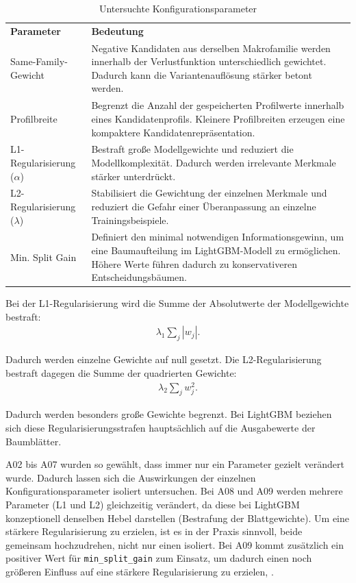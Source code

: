 \begin{table}[H] 
    \centering 
    \caption{Untersuchte Konfigurationsparameter} 
    \label{tab:konfigurationsparameter} 
    \begin{tabularx}{\textwidth}{p{4cm}X} 
        \toprule \textbf{Parameter} & \textbf{Bedeutung} \\ 
        Same-Family-Gewicht &  Negative Kandidaten aus derselben Makrofamilie werden innerhalb der Verlustfunktion unterschiedlich gewichtet. Dadurch kann die Variantenauflösung stärker betont werden. \\ 
        Profilbreite & Begrenzt die Anzahl der gespeicherten Profilwerte innerhalb eines Kandidatenprofils. Kleinere Profilbreiten erzeugen eine kompaktere Kandidatenrepräsentation. \\ 
        L1-Regularisierung ($\alpha$) & Bestraft große Modellgewichte und reduziert die Modellkomplexität. Dadurch werden irrelevante Merkmale stärker unterdrückt. \\ 
        L2-Regularisierung ($\lambda$) & Stabilisiert die Gewichtung der einzelnen Merkmale und reduziert die Gefahr einer Überanpassung an einzelne Trainingsbeispiele. \\ 
        Min. Split Gain & Definiert den minimal notwendigen Informationsgewinn, um eine Baumaufteilung im LightGBM-Modell zu ermöglichen. Höhere Werte führen dadurch zu konservativeren Entscheidungsbäumen. \\ 
        \bottomrule 
    \end{tabularx} 
\end{table} 

Bei der L1-Regularisierung wird die Summe der Absolutwerte der Modellgewichte bestraft:
\begin{align}
  \lambda_1 \sum_j |w_j|.
\end{align}

Dadurch werden einzelne Gewichte auf null gesetzt. 
Die L2-Regularisierung bestraft dagegen die Summe der quadrierten Gewichte:
\begin{align}
  \lambda_2 \sum_j w_j^2.
\end{align}

Dadurch werden besonders große Gewichte begrenzt. Bei LightGBM beziehen sich diese Regularisierungsstrafen hauptsächlich auf die Ausgabewerte der Baumblätter.

A02 bis A07 wurden so gewählt, dass immer nur ein Parameter gezielt verändert wurde. Dadurch lassen sich die Auswirkungen der einzelnen Konfigurationsparameter isoliert untersuchen.
Bei A08 und A09 werden mehrere Parameter (L1 und L2) gleichzeitig verändert, da diese bei LightGBM konzeptionell denselben Hebel darstellen (Bestrafung der Blattgewichte). 
Um eine stärkere Regularisierung zu erzielen, ist es in der Praxis sinnvoll, beide gemeinsam hochzudrehen, nicht nur einen isoliert.
Bei A09 kommt zusätzlich ein positiver Wert für \texttt{min\_split\_gain} zum Einsatz, um dadurch einen noch größeren Einfluss auf eine stärkere Regularisierung zu erzielen, \parencite{LTR_Configuration_Test_Series}.

